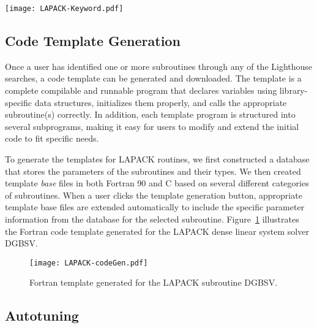 \documentclass{sig-alternate}
\begin{document}
\begin{figure*}[t]
\centering
\texttt{[image: LAPACK-Keyword.pdf]}
\vspace{-5pt}
\caption{Keyword search ``solve a system of linear equations general complex'' with Lighthouse for LAPACK.}
\label{fig:lapackKeyword}
\end{figure*}




\subsection{Code Template Generation}


Once a user has identified one or more subroutines through any of the Lighthouse searches, a code template can be generated and downloaded.
The template is a complete compilable and runnable program that declares variables using library-specific data structures, initializes
them properly, and calls the appropriate subroutine(s) correctly.
In addition, each template program is structured into several subprograms, making it easy for users to modify and extend the initial code to fit specific needs.

To generate the templates for LAPACK routines, we first constructed a database that stores the parameters of the subroutines and their types.
We then created template \textit{base} files in both Fortran 90 and C based on several different categories of subroutines. 
When a user clicks the template
generation button, appropriate template base files are extended automatically to include the specific parameter information
from the database for the selected subroutine. 
Figure~\ref{fig:lapackCode} illustrates the Fortran code template generated for the LAPACK dense linear system solver DGBSV.

\begin{figure}[ht]
\centering
\texttt{[image: LAPACK-codeGen.pdf]}
\caption{Fortran template generated for the LAPACK subroutine DGBSV.}
\label{fig:lapackCode}
\end{figure}


\subsection{Autotuning}
\end{document}

